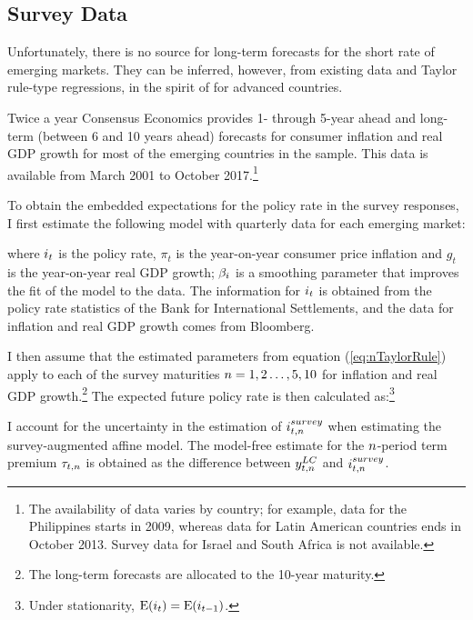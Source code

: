 {\subsection{Survey Data} \label{sec:SurveyData}
\iftoggle{toclinks}{\gototoc}{} %

Unfortunately, there is no source for long-term forecasts for the short rate of emerging markets. They can be inferred, however, from existing data and Taylor rule-type regressions, in the spirit of \cite{Wright:2011} for advanced countries.

Twice a year Consensus Economics provides 1- through 5-year ahead and long-term (between 6 and 10 years ahead) forecasts for consumer inflation and real GDP growth for most of the emerging countries in the sample. This data is available from March 2001 to October 2017.\footnote{ The availability of data varies by country; for example, data for the Philippines starts in 2009, whereas data for Latin American countries ends in October 2013. Survey data for Israel and South Africa is not available.}

To obtain the embedded expectations for the policy rate in the survey responses, I first estimate the following model with quarterly data for each emerging market:
	
\noindent where \(i_{t}\) is the policy rate, \(\pi_{t}\) is the year-on-year consumer price inflation and \(g_{t}\) is the year-on-year real GDP growth; 
$\beta_{i}$ is a smoothing parameter that improves the fit of the model to the data. 
The information for \(i_{t}\) is obtained from the policy rate statistics of the Bank for International Settlements, and the data for inflation and real GDP growth comes from Bloomberg.

I then assume that the estimated parameters from equation (\ref{eq:nTaylorRule}) apply to each of the survey maturities \(n = 1, 2 \ldots, 5, 10\) for inflation and real GDP growth.\footnote{ The long-term forecasts are allocated to the 10-year maturity.}
The expected future policy rate is then calculated as:\footnote{ Under stationarity, \(\mathrm{E}(i_{t}) = \mathrm{E}(i_{t-1})\).}
	
I account for the uncertainty in the estimation of \(i_{t,n}^{survey}\) when estimating the survey-augmented affine model.
The model-free estimate for the $n$-period term premium \(\tau_{t,n}\) is obtained as the difference between \(y_{t,n} ^{LC}\) and \(i_{t,n}^{survey}\).
%	

}
